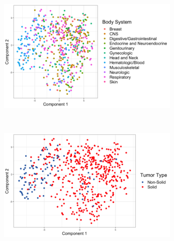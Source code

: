 \documentclass[10pt, letterpaper]{article}
\begin{document}
\begin{multicols*}{2}
\begin{figure}[!ht]
	\centering
	\begin{subfigure}[t]{0.5\textwidth}
		\centering
		\includegraphics[width=\columnwidth]{Figures/pca_m/body_system.png}
		\caption{}
		\label{fig:body_sys}
	\end{subfigure}%
	~
	\begin{subfigure}[t]{0.5\textwidth}
		\centering
		\includegraphics[width=0.97\columnwidth]{Figures/pca_m/tumortype.png}
		\caption{}
		\label{fig:tumor_type}
	\end{subfigure}
	

\end{figure}
\end{multicols*}
\end{document}
